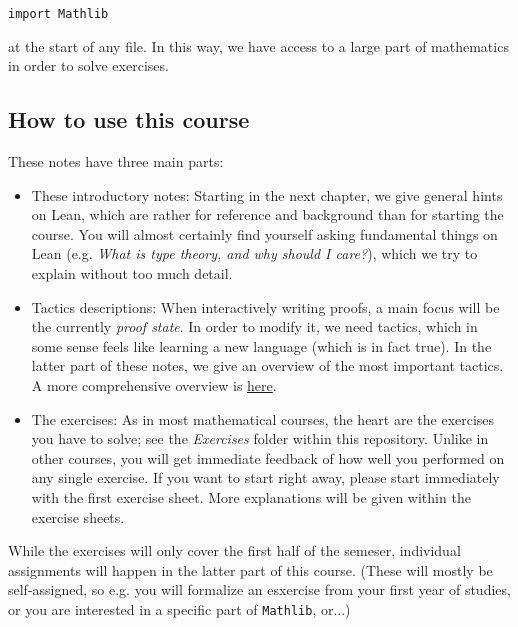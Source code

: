 \documentclass{memoir}
\begin{document}
\begin{verbatim}
import Mathlib

\end{verbatim}


at the start of any file. In this way, we have access to a large part of mathematics in order to solve exercises.



\subsection{How to use this course}

These notes have three main parts:

\begin{itemize}
\item These introductory notes: Starting in the next chapter, we give general hints on Lean, which are rather for reference and background than for starting the course. You will almost certainly find yourself asking fundamental things on Lean (e.g. \emph{What is type theory, and why should I care?}), which we try to explain without too much detail.\item Tactics descriptions: When interactively writing proofs, a main focus will be the currently \emph{proof state}. In order to modify it, we need tactics, which in some sense feels like learning a new language (which is in fact true). In the latter part of these notes, we give an overview of the most important tactics. A more comprehensive overview is \hyperlink{"https://github.com/haruhisa-enomoto/mathlib4-all-tactics/blob/main/all-tactics.md"}{here}.\item The exercises: As in most mathematical courses, the heart are the exercises you have to solve; see the \emph{Exercises} folder within this repository. Unlike in other courses, you will get immediate feedback of how well you performed on any single exercise. If you want to start right away, please start immediately with the first exercise sheet. More explanations will be given within the exercise sheets.
\end{itemize}


While the exercises will only cover the first half of the semeser, individual assignments will happen in the latter part of this course. (These will mostly be self-assigned, so e.g. you will formalize an esxercise from your first year of studies, or you are interested in a specific part of \Verb|Mathlib|, or...)
\end{document}
